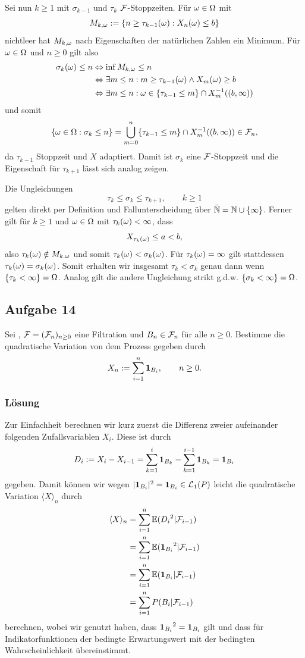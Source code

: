 \documentclass[12pt]{scrartcl}
\begin{document}
Sei nun $k\ge 1$ mit $\sigma_{k-1}$ und $\tau_{k}$ $\mathcal{F}$-Stoppzeiten. Für $\omega\in\Omega$ mit $$M_{k,\omega}:=\{n\ge \tau_{k-1}(\omega):X_n(\omega)\le b\}$$
nichtleer hat $M_{k,\omega}$ nach Eigenschaften der natürlichen Zahlen ein Minimum. Für $\omega\in\Omega$ und $n\ge 0$ gilt also
\begin{align*}
\sigma_k(\omega)\le n
&\Leftrightarrow \inf M_{k,\omega}\le n \\
&\Leftrightarrow \exists m\le n: m\ge\tau_{k-1}(\omega)\land X_m(\omega)\ge b \\
&\Leftrightarrow \exists m \le n: \omega\in\{\tau_{k-1}\le m\}\cap X_m^{-1}((b,\infty))
\end{align*}
und somit 
$$\{\omega\in\Omega:\sigma_k\le n\} = \bigcup_{m=0}^n\{\tau_{k-1}\le m\}\cap X_m^{-1}((b,\infty)) \in \mathcal{F}_n,$$
da $\tau_{k-1}$ Stoppzeit und $X$ adaptiert.
Damit ist $\sigma_k$ eine $\mathcal{F}$-Stoppzeit und die Eigenschaft für $\tau_{k+1}$ lässt sich analog zeigen.

Die Ungleichungen
$$\tau_k\le\sigma_k\le\tau_{k+1},\qquad k\ge 1$$
gelten direkt per Definition und Fallunterscheidung über $\bar{\mathbb{N}}=\mathbb{N}\cup\{\infty\}$.
Ferner gilt für $k\ge1$ und $\omega\in\Omega$ mit $\tau_k(\omega)<\infty$, dass
$$X_{\tau_k(\omega)}\le a < b,$$
also $\tau_k(\omega)\notin M_{k.\omega}$ und somit $\tau_k(\omega)<\sigma_k(\omega)$.
Für $\tau_k(\omega)=\infty$ gilt stattdessen $\tau_k(\omega)=\sigma_k(\omega)$.
Somit erhalten wir insgesamt $\tau_k<\sigma_k$ genau dann wenn $\{\tau_k<\infty\}=\Omega$. Analog gilt die andere Ungleichung strikt g.d.w. $\{\sigma_k<\infty\}=\Omega$.

\ausruecken

\subsection*{Aufgabe 14}

Sei \WraumAnn, $\mathcal{F}=(\mathcal{F}_n)_{n\ge 0}$ eine Filtration und $B_n\in\mathcal{F}_n$ für alle $n\ge0$. Bestimme die quadratische Variation von dem Prozess gegeben durch
$$X_n:=\sum_{i=1}^n \textbf{1}_{B_i},\qquad n\ge 0.$$

\subsubsection*{Lösung}
\einruecken

Zur Einfachheit berechnen wir kurz zuerst die Differenz zweier aufeinander folgenden Zufallsvariablen $X_i$. Diese ist durch 
$$ D_i := X_i - X_{i-1} = \sum_{k=1}^{i}\textbf{1}_{B_k} - \sum_{k=1}^{i-1}\textbf{1}_{B_k} = \textbf{1}_{B_i} $$
gegeben. Damit können wir wegen $|\textbf{1}_{B_i}|^2=\textbf{1}_{B_i}\in\mathcal{L}_1(P)$ leicht die quadratische Variation $ \langle X \rangle_n $ durch
\begin{align*}
	\langle X \rangle_n &= \sum_{i=1}^n \mathbb{E}({D_i}^2|\mathcal{F}_{i-1}) 						\\
						&= \sum_{i=1}^n \mathbb{E}({\textbf{1}_{B_i}}^2|\mathcal{F}_{i-1})			\\
						&= \sum_{i=1}^n \mathbb{E}(\textbf{1}_{B_i}|\mathcal{F}_{i-1})				\\
						&= \sum_{i=1}^n P(B_i | \mathcal{F}_{i-1})
\end{align*} 
berechnen, wobei wir genutzt haben, dass ${\textbf{1}_{B_i}}^2 = {\textbf{1}_{B_i}}$ gilt und dass für Indikatorfunktionen der bedingte Erwartungswert mit der bedingten Wahrscheinlichkeit übereinstimmt.
\end{document}
